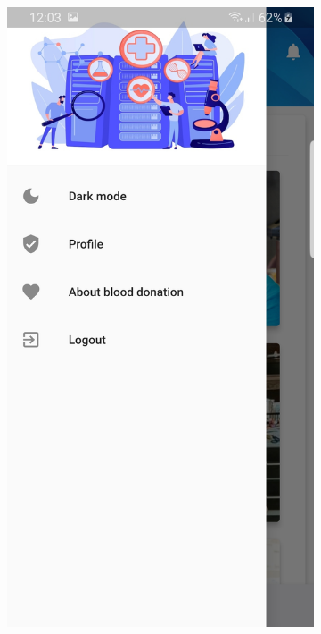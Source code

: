 \begin{figure}[H]
\centering

    \begin{subfigure}[b]{0.409\linewidth}
        \includegraphics[width=\linewidth]{images1/sidebardonor.jpg}

\end{subfigure}
\end{figure}
